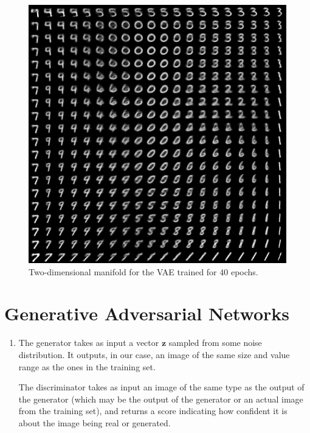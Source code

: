 \documentclass{article}
\begin{document}
\begin{enumerate}[label=\textbf{1.\arabic*}]
  \begin{figure}[ht]
      \centering
      \includegraphics[scale=0.4]{img/manifold.png}
      \caption{Two-dimensional manifold for the VAE trained for $40$ epochs.}
      \label{fig:manifold}
  \end{figure}
\end{enumerate}


\section{Generative Adversarial Networks}

\begin{enumerate}[label=\textbf{2.\arabic*}]
  \item
  The generator takes as input a vector $\bm{z}$ sampled from some noise distribution. It outputs, in our case, an image of the same size and value range as the ones in the training set.

  The discriminator takes as input an image of the same type as the output of the generator (which may be the output of the generator or an actual image from the training set), and returns a score indicating how confident it is about the image being real or generated.
\end{enumerate}
\end{document}
